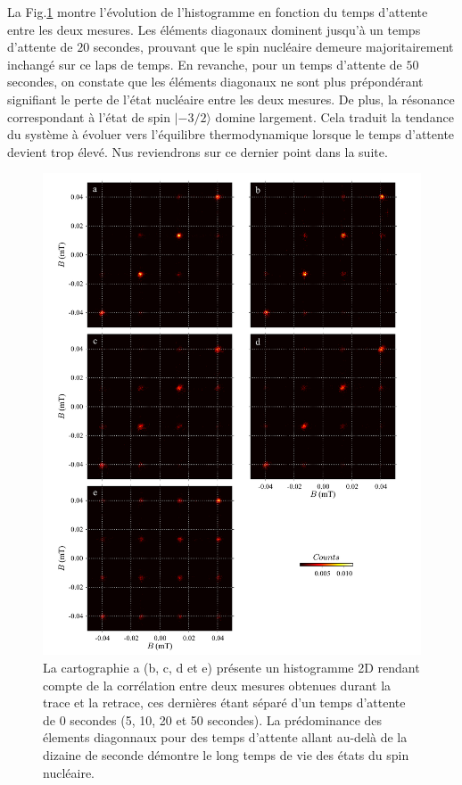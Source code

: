 La Fig.\ref{evolution_temps} montre l'évolution de l'histogramme en fonction du temps d'attente entre les deux mesures. Les éléments diagonaux dominent jusqu'à un temps d'attente de $20$ secondes, prouvant que le spin nucléaire demeure majoritairement inchangé sur ce laps de temps. En revanche, pour un temps d'attente de $50$ secondes, on constate que les éléments diagonaux ne sont plus prépondérant signifiant le perte de l'état nucléaire entre les deux mesures. De plus, la résonance correspondant à l'état de spin $|-3/2 \rangle$ domine largement. Cela traduit la tendance du système à évoluer vers l'équilibre thermodynamique lorsque le temps d'attente devient trop élevé. Nus reviendrons sur ce dernier point dans la suite.

\begin{figure}[h!]
\includegraphics[scale=0.45]{Resultats/HistTime/HistTime.pdf} 
\caption{La cartographie a (b, c, d et e) présente un histogramme 2D rendant compte de la corrélation entre deux mesures obtenues durant la trace et la retrace, ces dernières étant séparé d'un temps d'attente de 0 secondes (5, 10, 20 et 50 secondes). La prédominance des élements diagonnaux pour des temps d'attente allant au-delà de la dizaine de seconde démontre le long temps de vie des états du spin nucléaire.}
\label{evolution_temps}
\end{figure}


